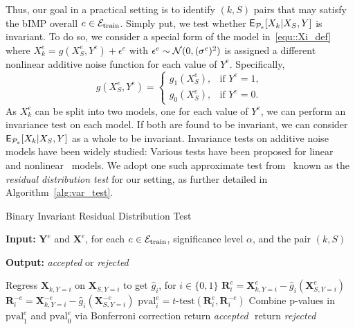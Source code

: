 \documentclass[conference,letterpaper]{IEEEtran}
\begin{document}
Thus, our goal in a practical setting is to identify $(k,S)$ pairs that may satisfy the bIMP overall $e\in\mathcal{E}_{\text{train}}$. Simply put, we test whether $\operatorname{\sf E}_{\mathcal{P}_e}[X_k|X_S,Y]$ is invariant. To do so, we consider a special form of the model in~\eqref{equ::Xi_def} where $X_k^e = g(X^e_S,Y^e) + \epsilon^e$ with $\epsilon^e\sim \mathcal{N}(0, (\sigma^e)^2)$ is assigned a different nonlinear additive noise function for each value of $Y^e$. Specifically, 
\begin{equation}\label{equ::model_Z}
    g(X_S^e,Y^e) =\begin{cases}
			g_1(X_S^e), & \text{if $Y^e = 1$},\\
            g_0(X_S^e), & \text{if $Y^e = 0$}.
		 \end{cases}
\end{equation}
As $X_k^e$ can be split into two models, one for each value of $Y^e$, we can perform an invariance test on each model. If both are found to be invariant, we can consider $\operatorname{\sf E}_{\mathcal{P}_e}[X_k|X_S,Y]$ as a whole to be invariant. Invariance tests on additive noise models have been widely studied: Various tests have been proposed for linear~\cite{peters2016causal} and nonlinear~\cite{heinze2018invariant} models. We adopt one such approximate test from~\cite{heinze2018invariant} known as the \emph{residual distribution test} for our setting, as further detailed in Algorithm~\ref{alg:var_test}. 

\begin{algorithm}
\caption{Binary Invariant Residual Distribution Test}\label{alg:var_test}
\textbf{Input:} $\bm{Y}^e$ and $\bm{X}^e$, for each $e\in\mathcal{E}_{\text{train}}$, significance level $\alpha$, and the pair $(k,S)$

\textbf{Output:} \emph{accepted} or \emph{rejected}
\begin{algorithmic}
 \State Regress $\bm{X}_{k,Y=i}$ on $\bm{X}_{S,Y=i}$ to get $\hat{g}_i$, for $i\in\{0,1\}$
\State $\bm{R}^e_i = \bm{X}^e_{k,Y=i} - \hat{g}_i(\bm{X}^e_{S,Y=i})$
\State $\bm{R}^{-e}_i = \bm{X}^{-e}_{k,Y=i} - \hat{g}_i(\bm{X}^{-e}_{S,Y=i})$
\State $\text{pval}_i^e = t\text{-test}(\bm{R}^{e}_i,\bm{R}^{-e}_i)$
\EndFor
\State Combine p-values in $\text{pval}_1^e$ and $\text{pval}_0^e$ via Bonferroni correction 
\State return \emph{accepted}
\Else $ $ return \emph{rejected}
\EndIf
\end{algorithmic}
\end{algorithm}
\end{document}
